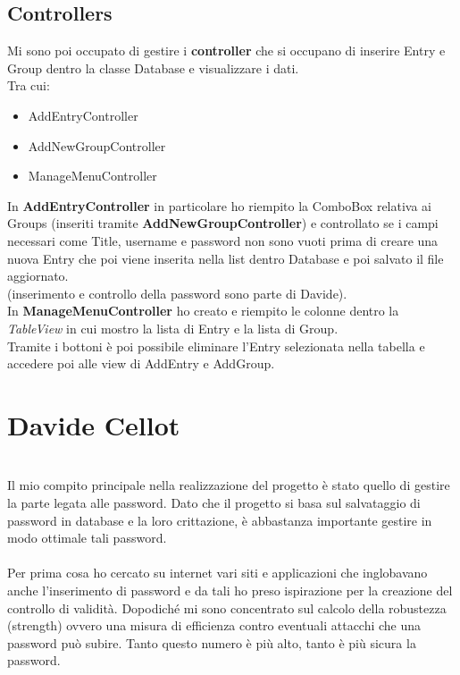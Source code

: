 \documentclass[a4paper,12pt]{report}
\begin{document}
\subsection*{Controllers}

Mi sono poi occupato di gestire i \textbf{controller} che si occupano di inserire Entry e Group dentro la classe Database e visualizzare i dati.\\
Tra cui:
\begin{itemize}
  \item AddEntryController
  \item AddNewGroupController
  \item ManageMenuController
\end{itemize}

In \textbf{AddEntryController} in particolare ho riempito la ComboBox relativa ai Groups (inseriti tramite \textbf{AddNewGroupController}) e controllato se i campi necessari come Title, username e password non sono vuoti prima di creare una nuova Entry che poi viene inserita nella list dentro Database e poi salvato il file aggiornato.\\(inserimento e controllo della password sono parte di Davide).\\

In \textbf{ManageMenuController} ho creato e riempito le colonne dentro la \textit{TableView} in cui mostro la lista di Entry e la lista di Group.\\Tramite i bottoni è poi possibile eliminare l'Entry selezionata nella tabella e accedere poi alle view di AddEntry e AddGroup.


\section*{Davide Cellot}
\\Il mio compito principale nella realizzazione del progetto è stato quello di gestire la parte legata alle password. Dato che il progetto si basa sul salvataggio di password in database e la loro crittazione, è abbastanza importante gestire in modo ottimale tali password.\\

\\Per prima cosa ho cercato su internet vari siti e applicazioni che inglobavano anche l’inserimento di password e da tali ho preso ispirazione per la creazione del controllo di validità. Dopodiché mi sono concentrato sul calcolo della robustezza (strength) ovvero una misura di efficienza contro eventuali attacchi che una password può subire. Tanto questo numero è più alto, tanto è più sicura la password.\\
\end{document}
